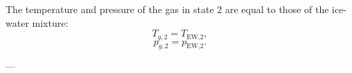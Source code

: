 The temperature and pressure of the gas in state 2 are equal to those of the ice-water mixture:  
\[
T_{g,2} = T_{\text{EW,2}},
\]
\[
p_{g,2} = p_{\text{EW,2}}.
\]

---